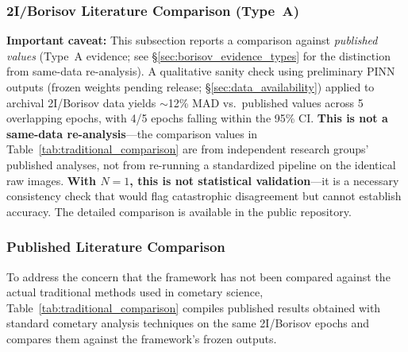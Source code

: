 \documentclass[usenatbib]{mnras}
\begin{document}
\subsubsection{2I/Borisov Literature Comparison (Type~A)}\label{sec:borisov_check}

\textbf{Important caveat:} This subsection reports a comparison against \textit{published values} (Type~A evidence; see \S\ref{sec:borisov_evidence_types} for the distinction from same-data re-analysis). A qualitative sanity check using preliminary PINN outputs (frozen weights pending release; \S\ref{sec:data_availability}) applied to archival 2I/Borisov data yields $\sim$12\% MAD vs.\ published values across 5 overlapping epochs, with 4/5 epochs falling within the 95\% CI. \textbf{This is not a same-data re-analysis}---the comparison values in Table~\ref{tab:traditional_comparison} are from independent research groups' published analyses, not from re-running a standardized pipeline on the identical raw images. \textbf{With $N=1$, this is not statistical validation}---it is a necessary consistency check that would flag catastrophic disagreement but cannot establish accuracy. The detailed comparison is available in the public repository.

\subsubsection{Published Literature Comparison}\label{sec:traditional_comparison}

To address the concern that the framework has not been compared against the actual traditional methods used in cometary science, Table~\ref{tab:traditional_comparison} compiles published results obtained with standard cometary analysis techniques on the same 2I/Borisov epochs and compares them against the framework's frozen outputs.
\end{document}
